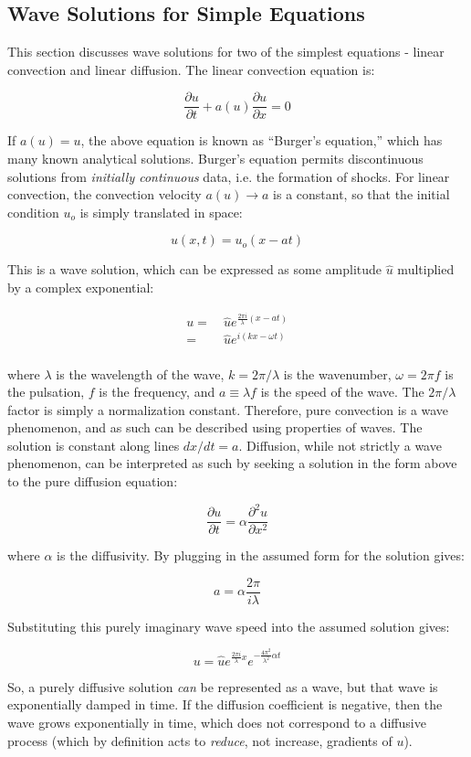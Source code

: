 \documentclass[10pt]{article}
\newcommand{\beq}{\begin{equation}}
\newcommand{\eeq}{\end{equation}}
\newcommand{\beqa}{\begin{equation}\begin{aligned}}
\newcommand{\eeqa}{\end{aligned}\end{equation}}
\begin{document}
\begin{flushleft}
\subsection{Wave Solutions for Simple Equations}
This section discusses wave solutions for two of the simplest equations - linear convection and linear diffusion. The linear convection equation is:

\beq
\frac{\partial u}{\partial t}+a(u)\frac{\partial u}{\partial x}=0
\eeq

If \(a(u)=u\), the above equation is known as ``Burger's equation,'' which has many known analytical solutions. Burger's equation permits discontinuous solutions from {\it initially continuous} data, i.e. the formation of shocks. For linear convection, the convection velocity \(a(u)\rightarrow a\) is a constant, so that the initial condition \(u_o\) is simply translated in space:

\beq
u(x,t)=u_o(x-at)
\eeq

This is a wave solution, which can be expressed as some amplitude \(\hat{u}\) multiplied by a complex exponential:

\beqa
\label{eq:1DWave}
u=&\ \hat{u}e^{\frac{2\pi i}{\lambda}(x-at)}\\
=&\ \hat{u}e^{i(kx-\omega t)}\\
\eeqa

where \(\lambda\) is the wavelength of the wave, \(k=2\pi/\lambda\) is the wavenumber, \(\omega=2\pi f\) is the pulsation, \(f\) is the frequency, and \(a\equiv\lambda f\) is the speed of the wave. The \(2\pi/\lambda\) factor is simply a normalization constant. Therefore, pure convection is a wave phenomenon, and as such can be described using properties of waves. The solution is constant along lines \(dx/dt=a\). Diffusion, while not strictly a wave phenomenon, can be interpreted as such by seeking a solution in the form above to the pure diffusion equation:

\beq
\frac{\partial u}{\partial t}=\alpha \frac{\partial^2u}{\partial x^2}
\eeq

where \(\alpha\) is the diffusivity. By plugging in the assumed form for the solution gives:

\beq
a=\alpha\frac{2\pi}{i\lambda}
\eeq

Substituting this purely imaginary wave speed into the assumed solution gives:

\beq
u=\hat{u}e^{\frac{2\pi i}{\lambda}x}e^{-\frac{4\pi^2}{\lambda^2}\alpha t}
\eeq

So, a purely diffusive solution {\it can} be represented as a wave, but that wave is exponentially damped in time. If the diffusion coefficient is negative, then the wave grows exponentially in time, which does not correspond to a diffusive process (which by definition acts to {\it reduce}, not increase, gradients of \(u\)). 


\end{flushleft}
\end{document}
